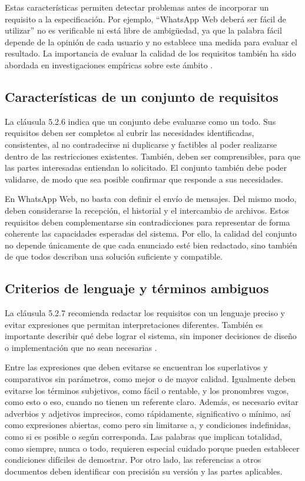 \documentclass[12pt,a4paper,oneside]{article}
\begin{document}
Estas características permiten detectar problemas antes de incorporar un requisito a la especificación. Por ejemplo, ``WhatsApp Web deberá ser fácil de utilizar'' no es verificable ni está libre de ambigüedad, ya que la palabra fácil depende de la opinión de cada usuario y no establece una medida para evaluar el resultado. La importancia de evaluar la calidad de los requisitos también ha sido abordada en investigaciones empíricas sobre este ámbito \cite{montgomery2022requirements}.

\subsection{Características de un conjunto de requisitos}

La cláusula 5.2.6 indica que un conjunto debe evaluarse como un todo. Sus requisitos deben ser completos al cubrir las necesidades identificadas, consistentes, al no contradecirse ni duplicarse y factibles al poder realizarse dentro de las restricciones existentes. También, deben ser comprensibles, para que las partes interesadas entiendan lo solicitado. El conjunto también debe poder validarse, de modo que sea posible confirmar que responde a sus necesidades.

En WhatsApp Web, no basta con definir el envío de mensajes. Del mismo modo, deben considerarse la recepción, el historial y el intercambio de archivos. Estos requisitos deben complementarse sin contradicciones para representar de forma coherente las capacidades esperadas del sistema. Por ello, la calidad del conjunto no depende únicamente de que cada enunciado esté bien redactado, sino también de que todos describan una solución suficiente y compatible.

\subsection{Criterios de lenguaje y términos ambiguos}

La cláusula 5.2.7 recomienda redactar los requisitos con un lenguaje preciso y evitar expresiones que permitan interpretaciones diferentes. También es importante describir qué debe lograr el sistema, sin imponer decisiones de diseño o implementación que no sean necesarias \cite{iso29148}.

Entre las expresiones que deben evitarse se encuentran los superlativos y comparativos sin parámetros, como mejor o de mayor calidad. Igualmente deben evitarse los términos subjetivos, como fácil o rentable, y los pronombres vagos, como esto o eso, cuando no tienen un referente claro. Además, es necesario evitar adverbios y adjetivos imprecisos, como rápidamente, significativo o mínimo, así como expresiones abiertas, como pero sin limitarse a, y condiciones indefinidas, como si es posible o según corresponda. Las palabras que implican totalidad, como siempre, nunca o todo, requieren especial cuidado porque pueden establecer condiciones difíciles de demostrar. Por otro lado, las referencias a otros documentos deben identificar con precisión su versión y las partes aplicables.
\end{document}
